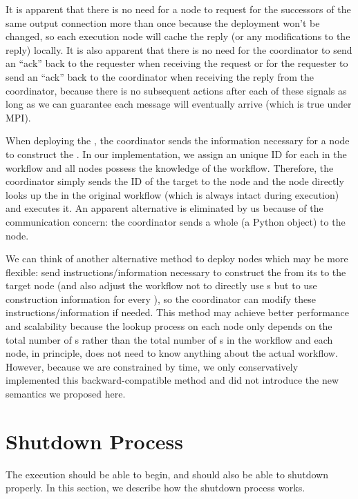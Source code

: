 It is apparent that there is no need for a node to request for the successors of the same output connection more than once because the deployment won't be changed, so each execution node will cache the reply (or any modifications to the reply) locally. It is also apparent that there is no need for the coordinator to send an ``ack'' back to the requester when receiving the request or for the requester to send an ``ack'' back to the coordinator when receiving the reply from the coordinator, because there is no subsequent actions after each of these signals as long as we can guarantee each message will eventually arrive (which is true under MPI).

When deploying the \tPEInst, the coordinator sends the information necessary for a node to construct the \tPEInst. In our implementation, we assign an unique ID for each \tPEInst in the workflow and all nodes possess the knowledge of the workflow. Therefore, the coordinator simply sends the ID of the target \tPEInst to the node and the node directly looks up the \tPEInst in the original workflow (which is always intact during execution) and executes it. An apparent alternative is eliminated by us because of the communication concern: the coordinator sends a whole \tPEInst (a Python object) to the node.

We can think of another alternative method to deploy nodes which may be more flexible: send instructions/information necessary to construct the \tPEInst from its \tPETmpl to the target node (and also adjust the workflow not to directly use \tPEInst{}s but to use construction information for every \tPEInst{}), so the coordinator can modify these instructions/information if needed. This method may achieve better performance and scalability because the lookup process on each node only depends on the total number of \tPETmpl{}s rather than the total number of \tPEInst{}s in the workflow and each node, in principle, does not need to know anything about the actual workflow. However, because we are constrained by time, we only conservatively implemented this backward-compatible method and did not introduce the new semantics we proposed here.

\section{Shutdown Process}
The execution should be able to begin, and should also be able to shutdown properly. In this section, we describe how the shutdown process works.

